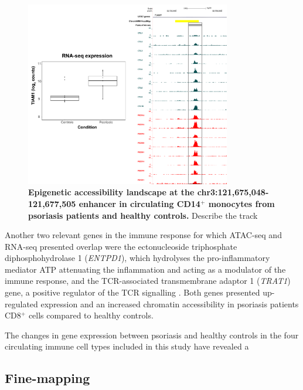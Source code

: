 \begin{figure}[htbp]
\centering
\includegraphics[width=0.8\textwidth]{./Results2/pdfs/ATAC_CD8_peak_TIAM1_RNA_combined}
\caption[Epigenetic landscape at the chr3:121,675,048-121,677,505 enhancer in circulating CD14$^+$ monocytes from psoriasis patients and healthy controls.]{\textbf{Epigenetic accessibility landscape at the chr3:121,675,048-121,677,505 enhancer in circulating CD14$^+$ monocytes from psoriasis patients and healthy controls.} Describe the track }
\label{figure:ATAC_RNAseq_CD8_TIAM1_combined}
\end{figure}



Another two relevant genes in the immune response for which ATAC-seq and RNA-seq presented overlap were the ectonucleoside triphosphate diphosphohydrolase 1 (\textit{ENTPD1}), which hydrolyses the pro-inflammatory mediator ATP attenuating the inflammation and acting as a modulator of the immune response, and the TCR-associated transmembrane adaptor 1 (\textit{TRAT1}) gene, a positive regulator of the TCR signalling \parencite{Antonioli2013, Valk2006}. Both genes presented up-regulated expression and an increased chromatin accessibility in psoriasis patients CD8$^+$ cells compared to healthy controls.

The changes in gene expression between psoriasis and healthy controls in the four circulating immune cell types included in this study have revealed a    

\subsection{Fine-mapping}



